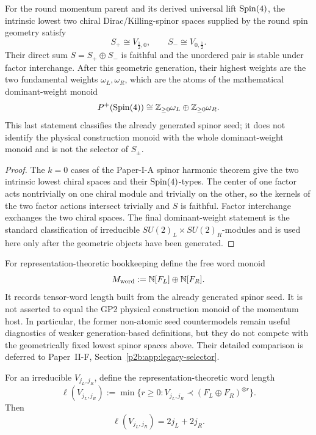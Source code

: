 \documentclass[12pt,a4paper]{article}
\begin{document}
\begin{theorem}
\label{p2b:thm:seed-atomicity}
For the round momentum parent and its derived universal lift \(\mathrm{Spin}(4)\), the
intrinsic lowest two chiral Dirac/Killing-spinor spaces supplied by the round
spin geometry satisfy
\[
 \boxed{S_+\cong V_{\frac12,0},\qquad S_-\cong V_{0,\frac12}.}
\]
Their direct sum \(S=S_+\oplus S_-\) is faithful and the unordered pair is
stable under factor interchange.  After this geometric generation, their
highest weights are the two fundamental weights \(\omega_L,\omega_R\), which
are the atoms of the mathematical dominant-weight monoid
\[
 P^+(\mathrm{Spin}(4))\cong\mathbb Z_{\ge0}\omega_L\oplus
 \mathbb Z_{\ge0}\omega_R.
\]
This last statement classifies the already generated spinor seed; it does not
identify the physical construction monoid with the whole dominant-weight
monoid and is not the selector of \(S_\pm\).
\end{theorem}

\begin{proof}
The \(k=0\) cases of the Paper-I-A spinor harmonic theorem give the two intrinsic
lowest chiral spaces and their \(\mathrm{Spin}(4)\)-types.  The center of one factor
acts nontrivially on one chiral module and trivially on the other, so the
kernels of the two factor actions intersect trivially and \(S\) is faithful.
Factor interchange exchanges the two chiral spaces.  The final dominant-weight
statement is the standard classification of irreducible
\(SU(2)_L\times SU(2)_R\)-modules and is used here only after the geometric
objects have been generated.
\end{proof}

\begin{remark}
\label{p2b:rem:seed-semantic-revision}
For representation-theoretic bookkeeping define the free word monoid
\[
 M_{\rm word}:=\mathbb N[F_L]\oplus\mathbb N[F_R].
\]
It records tensor-word length built from the already generated spinor seed.
It is not asserted to equal the GP2 physical construction monoid of the
momentum host.  In particular, the former non-atomic seed countermodels remain
useful diagnostics of weaker generation-based definitions, but they do not
compete with the geometrically fixed lowest spinor spaces above.  Their
detailed comparison is deferred to Paper~II-F, Section~\ref{p2b:app:legacy-selector}.
\end{remark}

\begin{lemma}
\label{p2b:lem:minimal-word-length}
For an irreducible \(V_{j_L,j_R}\), define the representation-theoretic word
length
\[
 \ell(V_{j_L,j_R})
 :=\min\{r\ge0:V_{j_L,j_R}\prec(F_L\oplus F_R)^{\otimes r}\}.
\]
Then
\[
 \boxed{\ell(V_{j_L,j_R})=2j_L+2j_R.}
\]
\end{lemma}
\end{document}
